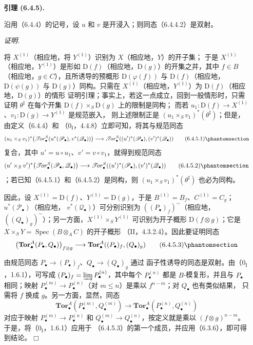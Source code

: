 \documentclass[UTF8,fontset=none,11pt,oneside,openany]{ctexbook}
\providecommand{\square}{\mdlgwhtsquare}
\newenvironment{proof}{%
  \par\smallskip\noindent\textit{证明.}\ %
}{\hfill$\square$\par}
\newcommand{\oldpage}[2][]{%
  \hypertarget{ega-source-page-#1-#2}{}%
  \marginnote{\scriptsize\textbf{#1}~|~#2}\ignorespaces}
\let\EGAOriginalLabel\label
\renewcommand{\label}[1]{\phantomsection\EGAOriginalLabel{#1}}
\newenvironment{namedtheorem}[2][]{%
  \par\medskip\noindent\textbf{#2 (#1).}\ %
}{\par}
\begin{document}
\begin{namedtheorem}[6.4.5]{引理}
沿用（6.4.4）的记号，设 $u$ 和 $v$ 是开浸入；则同态（6.4.4.2）是双射。
\end{namedtheorem}

\begin{proof}
将 $X^{(1)}$（相应地，将 $Y^{(1)}$）识别为 $X$（相应地，$Y$）的开子集；
于是 $X^{(1)}$（相应地，$Y^{(1)}$）是形如
$\mathrm D(f)$（相应地，$\mathrm D(g)$）的开集之并，其中 $f\in B$
（相应地，$g\in C$），且所诱导的预概形 $\mathrm D(\varphi(f))$ 与
$\mathrm D(f)$（相应地，$\mathrm D(\psi(g))$ 与 $\mathrm D(g)$）同构。只需在
$X^{(1)}$（相应地，$Y^{(1)}$）为 $\mathrm D(f)$（相应地，$\mathrm D(g)$）的情形
证明引理；事实上，若这一点成立，回到一般情形时，只需证明
$\theta^\sharp$ 在每个开集 $\mathrm D(f)\times_S\mathrm D(g)$ 上的限制是同构；
而若 $u_1:\mathrm D(f)\to X^{(1)}$、$v_1:\mathrm D(g)\to Y^{(1)}$ 是规范嵌入，
则上述限制正是 $(u_1\times_S v_1)^*(\theta^\sharp)$；但是，由定义（6.4.4）和
（$0_{\mathrm I}$，4.4.8）立即可知，将其与规范同态
\[
  (u_1\times_S v_1)^*
  \bigl(\mathscr{T}\!or_\bullet^S
    (u^*(\mathscr P_\bullet),v^*(\mathscr Q_\bullet))\bigr)
  \longrightarrow
  \mathscr{T}\!or_\bullet^S
  ((u')^*(\mathscr P_\bullet),(v')^*(\mathscr Q_\bullet))
  \tag{6.4.5.1}\label{III.6.4.5.1-fr}
\]
复合，其中 $u'=u\circ u_1$、$v'=v\circ v_1$，就得到规范同态
\[
  (u'\times_S v')^*
  \bigl(\mathscr{T}\!or_\bullet^S(\mathscr P_\bullet,\mathscr Q_\bullet)\bigr)
  \longrightarrow
  \mathscr{T}\!or_\bullet^S
  ((u')^*(\mathscr P_\bullet),(v')^*(\mathscr Q_\bullet))
  \tag{6.4.5.2}\label{III.6.4.5.2-fr}
\]
；若已知（6.4.5.1）和（6.4.5.2）是同构，则 $(u_1\times_S v_1)^*(\theta^\sharp)$
 也必为同构。

因此，设 $X^{(1)}=\mathrm D(f)$、$Y^{(1)}=\mathrm D(g)$，于是
$B^{(1)}=B_f$、$C^{(1)}=C_g$；$u^*(\mathscr P_\bullet)$（相应地，
$v^*(\mathscr Q_\bullet)$）可分别识别为 $((P_\bullet)_f)^{\sim}$（相应地，
$((Q_\bullet)_g)^{\sim}$）；另一方面，$X^{(1)}\times_S Y^{(1)}$ 可识别为开子概形
$\mathrm D(f\otimes g)$；它是 $X\times_S Y=\operatorname{Spec}(B\otimes_A C)$ 的开子概形
（II，4.3.2.4）。因此要证明同态
\[
  \bigl(\mathbf{Tor}_\bullet^A(P_\bullet,Q_\bullet)\bigr)_{f\otimes g}
  \longrightarrow
  \mathbf{Tor}_\bullet^A((P_\bullet)_f,(Q_\bullet)_g)
  \tag{6.4.5.3}\label{III.6.4.5.3-fr}
\]

\oldpage[III]{148}
由规范同态 $P_\bullet\to(P_\bullet)_f$、$Q_\bullet\to(Q_\bullet)_g$ 通过
函子性诱导的同态是双射。由（$0_{\mathrm I}$，1.6.1），可写成
$(P_\bullet)_f=\varinjlim P_\bullet^{(n)}$，其中每个 $P_\bullet^{(n)}$ 都是
$B$-模复形，并且与 $P_\bullet$ 相同；映射
$P_\bullet^{(m)}\to P_\bullet^{(n)}$（对 $m\leqslant n$）是乘以 $f^{n-m}$；对 $Q_\bullet$ 也有类似结果，
只需将 $f$ 换成 $g$。另一方面，显然，同态
\[
  \mathbf{Tor}_\bullet^A(P_\bullet^{(m)},Q_\bullet^{(m)})
  \longrightarrow
  \mathbf{Tor}_\bullet^A(P_\bullet^{(n)},Q_\bullet^{(n)})
\]
对应于映射 $P_\bullet^{(m)}\to P_\bullet^{(n)}$ 和
$Q_\bullet^{(m)}\to Q_\bullet^{(n)}$，按定义就是乘以 $(f\otimes g)^{n-m}$。于是，将（$0_{\mathrm I}$，1.6.1）应用于
（6.4.5.3）的第一个成员，并应用（6.3.6），即可得到结论。
\end{proof}
\end{document}
